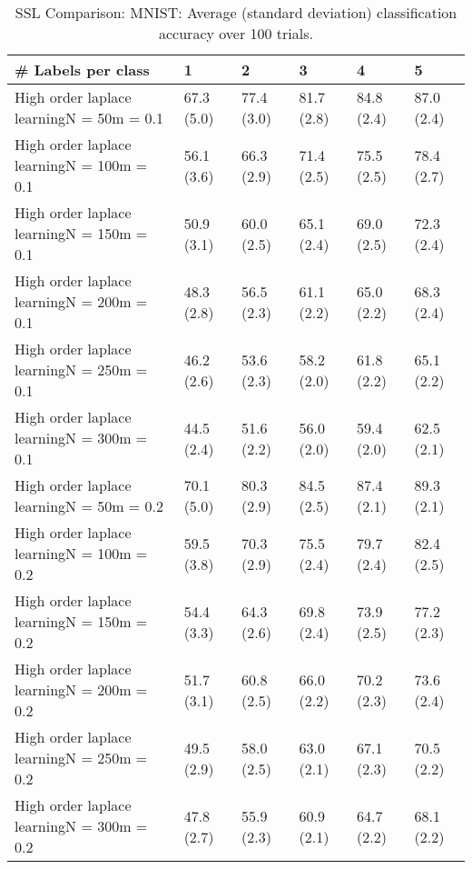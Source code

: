 \documentclass{article}
\begin{document}
\begin{table*}[t!]
\vspace{-3mm}
\caption{SSL Comparison: MNIST: Average (standard deviation) classification accuracy over 100 trials.}
\vspace{-3mm}
\label{tab:SSL Comparison: MNIST}
\vskip 0.15in
\begin{center}
\begin{small}
\begin{sc}
\begin{tabular}{llllll}
\toprule
\# Labels per class&\textbf{1}&\textbf{2}&\textbf{3}&\textbf{4}&\textbf{5}\\
\midrule
High order laplace learningN = 50m = 0.1&67.3 (5.0)      &77.4 (3.0)      &81.7 (2.8)      &84.8 (2.4)      &87.0 (2.4)      \\
High order laplace learningN = 100m = 0.1&56.1 (3.6)      &66.3 (2.9)      &71.4 (2.5)      &75.5 (2.5)      &78.4 (2.7)      \\
High order laplace learningN = 150m = 0.1&50.9 (3.1)      &60.0 (2.5)      &65.1 (2.4)      &69.0 (2.5)      &72.3 (2.4)      \\
High order laplace learningN = 200m = 0.1&48.3 (2.8)      &56.5 (2.3)      &61.1 (2.2)      &65.0 (2.2)      &68.3 (2.4)      \\
High order laplace learningN = 250m = 0.1&46.2 (2.6)      &53.6 (2.3)      &58.2 (2.0)      &61.8 (2.2)      &65.1 (2.2)      \\
High order laplace learningN = 300m = 0.1&44.5 (2.4)      &51.6 (2.2)      &56.0 (2.0)      &59.4 (2.0)      &62.5 (2.1)      \\
High order laplace learningN = 50m = 0.2&70.1 (5.0)      &80.3 (2.9)      &84.5 (2.5)      &87.4 (2.1)      &89.3 (2.1)      \\
High order laplace learningN = 100m = 0.2&59.5 (3.8)      &70.3 (2.9)      &75.5 (2.4)      &79.7 (2.4)      &82.4 (2.5)      \\
High order laplace learningN = 150m = 0.2&54.4 (3.3)      &64.3 (2.6)      &69.8 (2.4)      &73.9 (2.5)      &77.2 (2.3)      \\
High order laplace learningN = 200m = 0.2&51.7 (3.1)      &60.8 (2.5)      &66.0 (2.2)      &70.2 (2.3)      &73.6 (2.4)      \\
High order laplace learningN = 250m = 0.2&49.5 (2.9)      &58.0 (2.5)      &63.0 (2.1)      &67.1 (2.3)      &70.5 (2.2)      \\
High order laplace learningN = 300m = 0.2&47.8 (2.7)      &55.9 (2.3)      &60.9 (2.1)      &64.7 (2.2)      &68.1 (2.2)      \\

\end{tabular}
\end{sc}
\end{small}
\end{center}
\end{table*}
\end{document}
